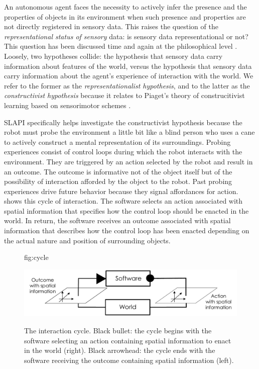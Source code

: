 \documentclass[pmlr]{jmlr}%
\begin{document}
An autonomous agent faces the necessity to actively infer the presence and the properties of objects in its environment when such presence and properties are not directly registered in sensory data. 
This raises the question of the \textit{representational status of sensory} data: is sensory data representational or not? 
This question has been discussed time and again at the philosophical level \citep[e.g.,][]{williford_husserls_2013}.
Loosely, two hypotheses collide: the hypothesis that sensory data carry information about features of the world, versus the hypothesis that sensory data carry information about the agent's experience of interaction with the world. 
We refer to the former as the \textit{representationalist hypothesis}, and to the latter as the \textit{constructivist hypothesis} because it relates to Piaget's theory of construcitivist learning based on sensorimotor schemes \citep{guillermin_artificial_2022}. 

SLAPI specifically helps investigate the constructivist hypothesis because the robot must probe the environment a little bit like a blind person who uses a cane to actively construct a mental representation of its surroundings. 
Probing experiences consist of control loops during which the robot interacts with the environment.   
They are triggered by an action selected by the robot and result in an outcome. 
The outcome is informative not of the object itself but of the possibility of interaction afforded by the object to the robot. 
Past probing experiences drive future behavior because they signal affordances for action. 
 shows this cycle of interaction. 
The software selects an action associated with spatial information that specifies how the control loop should be enacted in the world. 
In return, the software receives an outcome associated with spatial information that describes how the control loop has been enacted depending on the actual nature and position of surrounding objects. 


\begin{figure}[htbp]
	\floatconts
	{fig:cycle}
	{\caption{The interaction cycle. Black bullet: the cycle begins with the software selecting an action containing spatial information to enact in the world (right). Black arrowhead: the cycle ends with the software receiving the outcome containing spatial information (left).}}
	{\includegraphics[width=0.8\linewidth]{images/Figure_0_Cycle}}
\end{figure}
\end{document}
